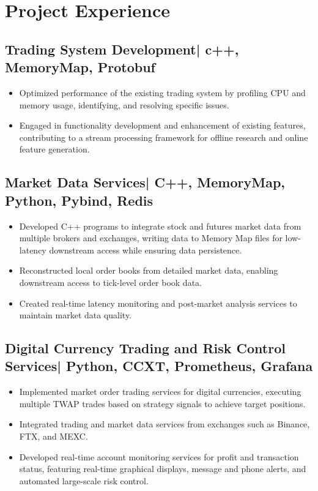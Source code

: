 \documentclass{resume}
\begin{document}
\section{Project Experience}

\subsection{\textbf{Trading System Development}| c++, MemoryMap, Protobuf}
\begin{itemize}
\item Optimized performance of the existing trading system by profiling CPU and memory usage, identifying, and resolving specific issues. 
\item Engaged in functionality development and enhancement of existing features, contributing to a stream processing framework for offline research and online feature generation.
\end{itemize}

\subsection{\textbf{Market Data Services}| C++, MemoryMap, Python, Pybind, Redis}
\begin{itemize}
\item Developed C++ programs to integrate stock and futures market data from multiple brokers and exchanges, writing data to Memory Map files for low-latency downstream access while ensuring data persistence.
\item Reconstructed local order books from detailed market data, enabling downstream access to tick-level order book data.
\item Created real-time latency monitoring and post-market analysis services to maintain market data quality.
\end{itemize}

\subsection{\textbf{Digital Currency Trading and Risk Control Services}| Python, CCXT, Prometheus, Grafana}
\begin{itemize}
\item Implemented market order trading services for digital currencies, executing multiple TWAP trades based on strategy signals to achieve target positions.
\item Integrated trading and market data services from exchanges such as Binance, FTX, and MEXC.
\item Developed real-time account monitoring services for profit and transaction status, featuring real-time graphical displays, message and phone alerts, and automated large-scale risk control.
\end{itemize}
\end{document}
